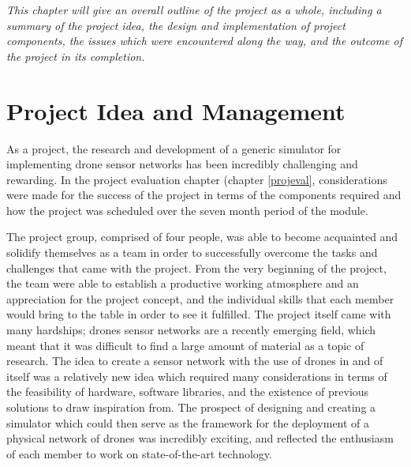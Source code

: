 \emph{This chapter will give an overall outline of the project as a whole, including a summary of the project idea, the design and implementation of project components, the issues which were encountered along the way, and the outcome of the project in its completion.}

\section{Project Idea and Management}
As a project, the research and development of a generic simulator for implementing drone sensor networks has been incredibly challenging and rewarding. In the project evaluation chapter (chapter \ref{projeval}, considerations were made for the success of the project in terms of the components required and how the project was scheduled over the seven month period of the module. 

The project group, comprised of four people, was able to become acquainted and solidify themselves as a team in order to successfully overcome the tasks and challenges that came with the project. From the very beginning of the project, the team were able to establish a productive working atmosphere and an appreciation for the project concept, and the individual skills that each member would bring to the table in order to see it fulfilled. The project itself came with many hardships; drones sensor networks are a recently emerging field, which meant that it was difficult to find a large amount of material as a topic of research. The idea to create a sensor network with the use of drones in and of itself was a relatively new idea which required many considerations in terms of the feasibility of hardware, software libraries, and the existence of previous solutions to draw inspiration from. The prospect of designing and creating a simulator which could then serve as the framework for the deployment of a physical network of drones was incredibly exciting, and reflected the enthusiasm of each member to work on state-of-the-art technology. 

